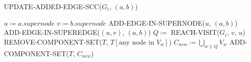 \begin{algorithm}[H]
    \caption{UPDATE-ADDED-EDGE-SCC($G_i$, $(a, b)$)}\label{alg:add-edge-scc}
    \begin{algorithmic}[1]
        \State $u \coloneqq a.supernode$
        \State $v \coloneqq b.supernode$
            \State ADD-EDGE-IN-SUPERNODE($u$, $(a, b)$)
        \Else
            \State ADD-EDGE-IN-SUPEREDGE($(u, v)$, $(a, b)$)
                \State $Q \coloneqq$ REACH-VISIT($G_i$, $v$, $u$)
                            \State REMOVE-COMPONENT-SET($T$, $T[\text{any node in } V_w]$)
                        \EndFor
                        \State $C_{new} \coloneqq \bigcup_{w \in Q} V_w$
                        \State ADD-COMPONENT-SET($T$, $C_{new}$)
                    \EndIf
            \EndIf
        \EndIf
    \end{algorithmic}
\end{algorithm}